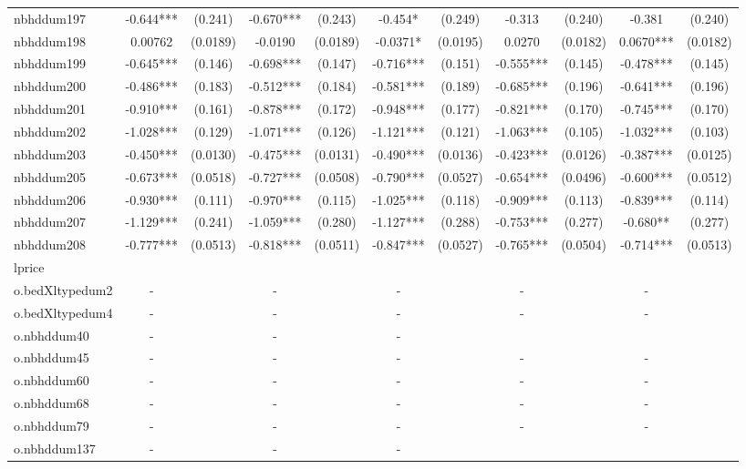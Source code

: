 \documentclass[]{article}
\begin{document}
\begin{tabular}{lcccccccccc}
nbhddum197 & -0.644*** & (0.241) & -0.670*** & (0.243) & -0.454* & (0.249) & -0.313 & (0.240) & -0.381 & (0.240) \\
nbhddum198 & 0.00762 & (0.0189) & -0.0190 & (0.0189) & -0.0371* & (0.0195) & 0.0270 & (0.0182) & 0.0670*** & (0.0182) \\
nbhddum199 & -0.645*** & (0.146) & -0.698*** & (0.147) & -0.716*** & (0.151) & -0.555*** & (0.145) & -0.478*** & (0.145) \\
nbhddum200 & -0.486*** & (0.183) & -0.512*** & (0.184) & -0.581*** & (0.189) & -0.685*** & (0.196) & -0.641*** & (0.196) \\
nbhddum201 & -0.910*** & (0.161) & -0.878*** & (0.172) & -0.948*** & (0.177) & -0.821*** & (0.170) & -0.745*** & (0.170) \\
nbhddum202 & -1.028*** & (0.129) & -1.071*** & (0.126) & -1.121*** & (0.121) & -1.063*** & (0.105) & -1.032*** & (0.103) \\
nbhddum203 & -0.450*** & (0.0130) & -0.475*** & (0.0131) & -0.490*** & (0.0136) & -0.423*** & (0.0126) & -0.387*** & (0.0125) \\
nbhddum205 & -0.673*** & (0.0518) & -0.727*** & (0.0508) & -0.790*** & (0.0527) & -0.654*** & (0.0496) & -0.600*** & (0.0512) \\
nbhddum206 & -0.930*** & (0.111) & -0.970*** & (0.115) & -1.025*** & (0.118) & -0.909*** & (0.113) & -0.839*** & (0.114) \\
nbhddum207 & -1.129*** & (0.241) & -1.059*** & (0.280) & -1.127*** & (0.288) & -0.753*** & (0.277) & -0.680** & (0.277) \\
nbhddum208 & -0.777*** & (0.0513) & -0.818*** & (0.0511) & -0.847*** & (0.0527) & -0.765*** & (0.0504) & -0.714*** & (0.0513) \\
lprice &  &  &  &  &  &  &  &  &  &  \\
o.bedXltypedum2 & - &  & - &  & - &  & - &  & - &  \\
o.bedXltypedum4 & - &  & - &  & - &  & - &  & - &  \\
o.nbhddum40 & - &  & - &  & - &  &  &  &  &  \\
o.nbhddum45 & - &  & - &  & - &  & - &  & - &  \\
o.nbhddum60 & - &  & - &  & - &  & - &  & - &  \\
o.nbhddum68 & - &  & - &  & - &  & - &  & - &  \\
o.nbhddum79 & - &  & - &  & - &  & - &  & - &  \\
o.nbhddum137 & - &  & - &  & - &  &  &  &  &  \\

\end{tabular}
\end{document}
